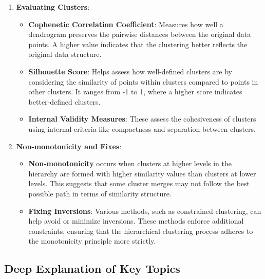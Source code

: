 \documentclass[a4paper,12pt]{article}
\begin{document}
\begin{enumerate}
\begin{enumerate}
    \item \textbf{Evaluating Clusters}:
    \begin{itemize}
        \item \textbf{Cophenetic Correlation Coefficient}: Measures how well a dendrogram preserves the pairwise distances between the original data points. A higher value indicates that the clustering better reflects the original data structure.
        \item \textbf{Silhouette Score}: Helps assess how well-defined clusters are by considering the similarity of points within clusters compared to points in other clusters. It ranges from -1 to 1, where a higher score indicates better-defined clusters.
        \item \textbf{Internal Validity Measures}: These assess the cohesiveness of clusters using internal criteria like compactness and separation between clusters.
    \end{itemize}

    \item \textbf{Non-monotonicity and Fixes}:
    \begin{itemize}
        \item \textbf{Non-monotonicity} occurs when clusters at higher levels in the hierarchy are formed with higher similarity values than clusters at lower levels. This suggests that some cluster merges may not follow the best possible path in terms of similarity structure.
        \item \textbf{Fixing Inversions}: Various methods, such as constrained clustering, can help avoid or minimize inversions. These methods enforce additional constraints, ensuring that the hierarchical clustering process adheres to the monotonicity principle more strictly.
    \end{itemize}
\end{enumerate}

\hrulefill

\subsection{Deep Explanation of Key Topics}


\end{enumerate}
\end{document}
